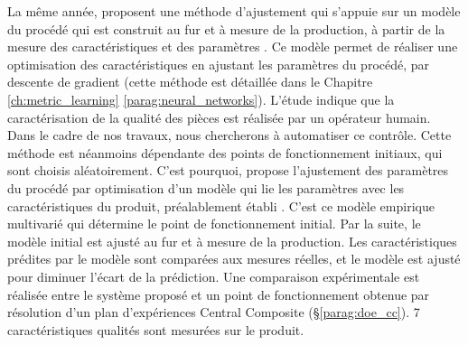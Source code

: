 La même année, \citeauthor{ivester_automatic_1998} proposent une méthode d'ajustement qui s'appuie sur un modèle du procédé qui est construit au fur et à mesure de la production, à partir de la mesure des caractéristiques et des paramètres \cite{ivester_automatic_1998}.
Ce modèle permet de réaliser une optimisation des caractéristiques en ajustant les paramètres du procédé, par descente de gradient (cette méthode est détaillée dans le Chapitre \ref{ch:metric_learning} \ref{parag:neural_networks}).
L'étude indique que la caractérisation de la qualité des pièces est réalisée par un opérateur humain.
Dans le cadre de nos travaux, nous chercherons à automatiser ce contrôle.
Cette méthode est néanmoins dépendante des points de fonctionnement initiaux, qui sont choisis aléatoirement.
C’est pourquoi, \citeauthor{yang_knowledgebased_2000} propose l'ajustement des paramètres du procédé par optimisation d'un modèle qui lie les paramètres avec les caractéristiques du produit, préalablement établi \cite{yang_knowledgebased_2000}.
C’est ce modèle empirique multivarié qui détermine le point de fonctionnement initial.
Par la suite, le modèle initial est ajusté au fur et à mesure de la production.
Les caractéristiques prédites par le modèle sont comparées aux mesures réelles, et le modèle est ajusté pour diminuer l'écart de la prédiction.
Une comparaison expérimentale est réalisée entre le système proposé et un point de fonctionnement obtenue par résolution d'un plan d'expériences Central Composite (§\ref{parag:doe_cc}).
7 caractéristiques qualités sont mesurées sur le produit.
